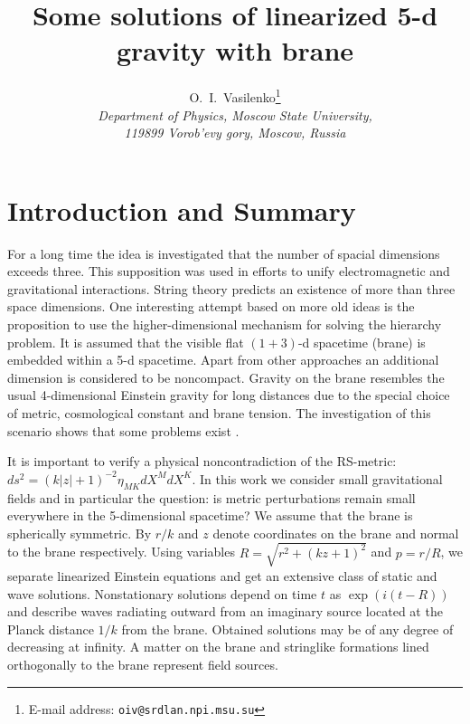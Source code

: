 \documentclass[letterpaper,12pt]{article}
\title{Some solutions of linearized 5-d gravity with brane}
\author{O.~I.~Vasilenko\thanks{E-mail address:
\texttt{oiv@srdlan.npi.msu.su}}
\\[6pt]
\emph{\small Department of Physics, Moscow State University,}\\
\emph{\small  119899 Vorob'evy gory, Moscow, Russia}}
\date{}
\begin{document}
\maketitle {}

\section{Introduction and Summary}\label{intro}
For a long time the idea is investigated that the number of
spacial dimensions exceeds three.  This supposition was used in
efforts to unify electromagnetic and gravitational interactions.
String theory predicts an existence of more than three space
dimensions. One interesting attempt \cite{Randall99a,Randall99b}
based on more old ideas \cite{Rubakov83, Akama83, Visser85} is the
proposition to use the higher-dimensional mechanism for solving
the hierarchy problem. It is assumed that the visible flat
$(1+3)$-d spacetime (brane) is embedded within a 5-d spacetime.
Apart from other approaches an additional dimension is considered
to be noncompact. Gravity on the brane resembles the usual
4-dimensional Einstein gravity for long distances due to the
special choice of metric, cosmological constant and brane tension.
The investigation of this scenario shows that  some problems exist
\cite{Mueck00}.

It is important to verify a physical noncontradiction of the
RS-metric: $ds^2=(k|z|+1)^{-2}\eta_{MK}dX^MdX^K$. In this work we
consider small gravitational fields and in particular the
question: is metric perturbations remain small everywhere in the
5-dimensional spacetime? We assume that the brane is spherically
symmetric. By $r/k$ and $z$ denote coordinates on the brane and
normal to the brane respectively. Using variables
$R=\sqrt{r^2+(kz+1)^2}$ and $p=r/R$, we separate linearized
Einstein equations and get an extensive class of static and wave
solutions. Nonstationary solutions depend on time $t$ as
$\exp(i(t-R))$ and describe waves radiating outward from an
imaginary source located at the Planck distance $1/k$ from the
brane. Obtained solutions may be of any degree of decreasing at
infinity. A matter on the brane and stringlike formations lined
orthogonally to the brane represent field sources.
\end{document}
